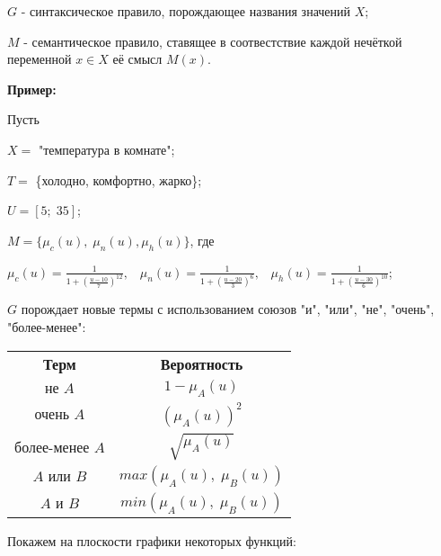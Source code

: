 \documentclass[18pt, a4paper]{extarticle}
\newcommand{\primer}{\textbf{Пример:\;}}
\begin{document}
$G$ - синтаксическое правило, порождающее названия значений $X$;

$M$ - семантическое правило, ставящее в соотвестствие каждой нечёткой переменной $x\in X$ её смысл $M(x)$.

\primer

Пусть

$X=$ "температура в комнате"{};

$T=$ \{холодно, комфортно, жарко\};

$U=[5;\;35]$;

$M=\{\mu_c(u),\;\mu_n(u), \mu_h(u)\}$, где

$\mu_c(u)=\frac{1}{1+(\frac{u-10}{7})^{12}},\;\;\;\mu_n(u)=\frac{1}{1+(\frac{u-20}{3})^{6}},\;\;\;\mu_h(u)=\frac{1}{1+(\frac{u-30}{6})^{10}}$;

$G$ порождает новые термы с использованием союзов "и"{}, "или"{}, "не"{}, "очень"{}, "более-менее"{}:

\begin{center}
\begin{tabular}{|c|c|}
\cline{1-2}
\textbf{Терм} & \textbf{Вероятность} \\
\cline{1-2}
$\textbf{не }A$ & $1-\mu_A(u)$ \\
\cline{1-2}
$\textbf{очень }A$ & $(\mu_A(u))^2$ \\
\cline{1-2}
$\textbf{более-менее }A$ & $\sqrt{\mu_A(u)}$ \\
\cline{1-2}
$A\textbf{ или }B$ & $max(\mu_A(u),\;\mu_B(u))$ \\
\cline{1-2}
$A\textbf{ и }B$ & $min(\mu_A(u),\;\mu_B(u))$ \\
\cline{1-2}
\end{tabular}
\end{center}\newpage

Покажем на плоскости графики некоторых функций:
\end{document}
